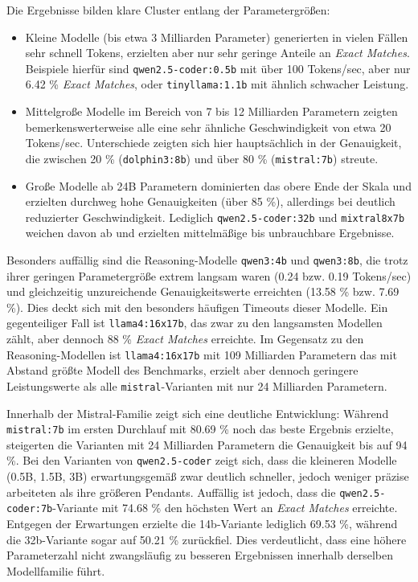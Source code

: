 Die Ergebnisse bilden klare Cluster entlang der Parametergrößen:
\begin{itemize}
    \item Kleine Modelle (bis etwa 3 Milliarden Parameter) generierten in vielen Fällen sehr schnell Tokens, erzielten aber nur sehr geringe Anteile an \textit{Exact Matches}. Beispiele hierfür sind \texttt{qwen2.5-coder:0.5b} mit über \num{100} Tokens/sec, aber nur \num{6.42} \% \textit{Exact Matches}, oder \texttt{tinyllama:1.1b} mit ähnlich schwacher Leistung.
    \item Mittelgroße Modelle im Bereich von 7 bis 12 Milliarden Parametern zeigten bemerkenswerterweise alle eine sehr ähnliche Geschwindigkeit von etwa \num{20} Tokens/sec. Unterschiede zeigten sich hier hauptsächlich in der Genauigkeit, die zwischen \num{20} \% (\texttt{dolphin3:8b}) und über \num{80} \% (\texttt{mistral:7b}) streute.
    \item Große Modelle ab 24B Parametern dominierten das obere Ende der Skala und erzielten durchweg hohe Genauigkeiten (über \num{85} \%), allerdings bei deutlich reduzierter Geschwindigkeit. Lediglich \texttt{qwen2.5-coder:32b} und \texttt{mixtral8x7b} weichen davon ab und erzielten mittelmäßige bis unbrauchbare Ergebnisse.
\end{itemize}

Besonders auffällig sind die Reasoning-Modelle \texttt{qwen3:4b} und \texttt{qwen3:8b}, die trotz ihrer geringen Parametergröße extrem langsam waren (\num{0.24} bzw. \num{0.19} Tokens/sec) und gleichzeitig unzureichende Genauigkeitswerte erreichten (\num{13.58} \% bzw. \num{7.69} \%). Dies deckt sich mit den besonders häufigen Timeouts dieser Modelle.
Ein gegenteiliger Fall ist \texttt{llama4:16x17b}, das zwar zu den langsamsten Modellen zählt, aber dennoch \num{88} \% \textit{Exact Matches} erreichte.
Im Gegensatz zu den Reasoning-Modellen ist \texttt{llama4:16x17b} mit 109 Milliarden Parametern das mit Abstand größte Modell des Benchmarks, erzielt aber dennoch geringere Leistungswerte als alle \texttt{mistral}-Varianten mit nur 24 Milliarden Parametern.

Innerhalb der Mistral-Familie zeigt sich eine deutliche Entwicklung: Während \texttt{mistral:7b} im ersten Durchlauf mit \num{80.69} \% noch das beste Ergebnis erzielte, steigerten die Varianten mit 24 Milliarden Parametern die Genauigkeit bis auf \num{94}  \%.
Bei den Varianten von \texttt{qwen2.5-coder} zeigt sich, dass die kleineren Modelle (0.5B, 1.5B, 3B) erwartungsgemäß zwar deutlich schneller, jedoch weniger präzise arbeiteten als ihre größeren Pendants.
Auffällig ist jedoch, dass die \texttt{qwen2.5-coder:7b}-Variante mit \num{74,68} \% den höchsten Wert an \textit{Exact Matches} erreichte.
Entgegen der Erwartungen erzielte die 14b-Variante lediglich \num{69,53} \%, während die 32b-Variante sogar auf \num{50,21} \% zurückfiel.
Dies verdeutlicht, dass eine höhere Parameterzahl nicht zwangsläufig zu besseren Ergebnissen innerhalb derselben Modellfamilie führt.

